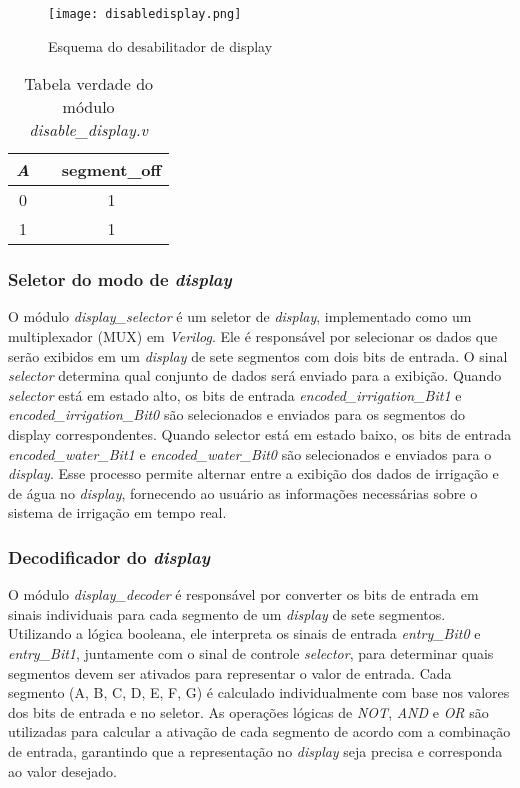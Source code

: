 \documentclass[
	article,			%
	11pt,				%
	oneside,			%
	a4paper,			%
	english,			%
	brazil,				%
	sumario=tradicional
	]{abntex2}
\begin{document}
\begin{figure}[H]
    \centering
    \texttt{[image: disabledisplay.png]}
    \caption{Esquema do desabilitador de display}
    \label{fig:dis-display}
\end{figure}


\begin{table}[H]
\centering
\begin{tabular}{|c|c|c|}
\hline
\textit{A} &  & segment\_off \\ \hline
0          &  & 1            \\ \hline
1          &  & 1            \\ \hline
\end{tabular}
\caption{Tabela verdade do módulo \textit{disable\_display.v}}
\label{tab:disable-display}
\end{table}

\subsubsection{Seletor do modo de \textit{display}}
O módulo \textit{display\_selector} é um seletor de \textit{display}, implementado como um multiplexador (MUX) em \textit{Verilog}. Ele é responsável por selecionar os dados que serão exibidos em um \textit{display} de sete segmentos com dois bits de entrada. O sinal \textit{selector} determina qual conjunto de dados será enviado para a exibição. Quando \textit{selector} está em estado alto, os bits de entrada \textit{encoded\_irrigation\_Bit1} e \textit{encoded\_irrigation\_Bit0} são selecionados e enviados para os segmentos do display correspondentes. Quando selector está em estado baixo, os bits de entrada \textit{encoded\_water\_Bit1} e \textit{encoded\_water\_Bit0} são selecionados e enviados para o \textit{display}. Esse processo permite alternar entre a exibição dos dados de irrigação e de água no \textit{display}, fornecendo ao usuário as informações necessárias sobre o sistema de irrigação em tempo real.

\subsubsection{Decodificador do \textit{display}}
O módulo \textit{display\_decoder} é responsável por converter os bits de entrada em sinais individuais para cada segmento de um \textit{display} de sete segmentos. Utilizando a lógica booleana, ele interpreta os sinais de entrada \textit{entry\_Bit0} e \textit{entry\_Bit1}, juntamente com o sinal de controle \textit{selector}, para determinar quais segmentos devem ser ativados para representar o valor de entrada. Cada segmento (A, B, C, D, E, F, G) é calculado individualmente com base nos valores dos bits de entrada e no seletor. As operações lógicas de \textit{NOT}, \textit{AND} e \textit{OR} são utilizadas para calcular a ativação de cada segmento de acordo com a combinação de entrada, garantindo que a representação no \textit{display} seja precisa e corresponda ao valor desejado. 
\end{document}
